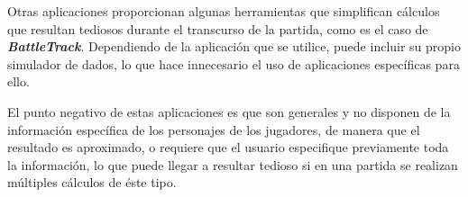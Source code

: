 \vspace{1cm}

Otras aplicaciones proporcionan algunas herramientas que simplifican  
cálculos que resultan tediosos durante el transcurso de la partida, como 
es el caso de \textit{\textbf{BattleTrack}}. Dependiendo de la aplicación 
que se utilice, puede incluir su propio simulador de dados, lo que hace 
innecesario el uso de aplicaciones específicas para ello. \medskip

El punto negativo de estas aplicaciones es que son generales y no disponen de 
la información específica de los personajes de los jugadores, de manera que 
el resultado es aproximado, o requiere que el usuario especifique previamente 
toda la información, lo que puede llegar a resultar tedioso si en una partida 
se realizan múltiples cálculos de éste tipo. \vspace{1cm}


